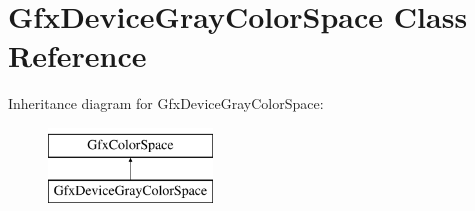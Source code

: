 \hypertarget{class_gfx_device_gray_color_space}{}\section{Gfx\+Device\+Gray\+Color\+Space Class Reference}
\label{class_gfx_device_gray_color_space}
Inheritance diagram for Gfx\+Device\+Gray\+Color\+Space\+:\begin{figure}[H]
\begin{center}
\leavevmode
\includegraphics[height=2.000000cm]{class_gfx_device_gray_color_space}
\end{center}
\end{figure}

